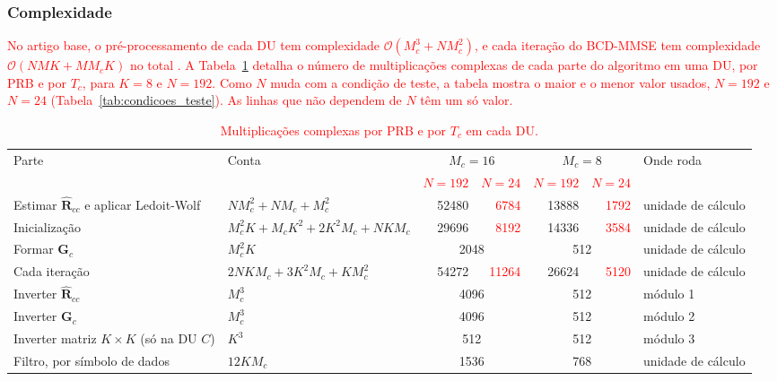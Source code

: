 \subsubsection{Complexidade}\label{subsubsec:bcd-complexidade}
\textcolor{red}{No artigo base, o pré-processamento de cada DU tem complexidade $\mathcal{O}(M_c^3 + N M_c^2)$, e cada iteração do BCD-MMSE tem complexidade $\mathcal{O}(NMK + M M_c K)$ no total \cite{zhao2025jsac}. A Tabela~\ref{tab:bcd-complexidade} detalha o número de multiplicações complexas de cada parte do algoritmo em uma DU, por PRB e por $T_c$, para $K = 8$ e \sout{$N = 192$}.} \textcolor{red}{Como $N$ muda com a condição de teste, a tabela mostra o maior e o menor valor usados, $N = 192$ e $N = 24$ (Tabela~\ref{tab:condicoes_teste}). As linhas que não dependem de $N$ têm um só valor.}

\begin{table}[htbp]
\caption{\textcolor{red}{Multiplicações complexas por PRB e por $T_c$ em cada DU.}}
\label{tab:bcd-complexidade}
\centering
\footnotesize
\renewcommand{\arraystretch}{1.2}
\begin{tabular}{|p{3.6cm}|l|r|r|r|r|l|}
\hline
\raggedright Parte & Conta & \multicolumn{2}{c|}{$M_c = 16$} & \multicolumn{2}{c|}{$M_c = 8$} & Onde roda \tabularnewline
\cline{3-6}
 & & \textcolor{red}{$N = 192$} & \textcolor{red}{$N = 24$} & \textcolor{red}{$N = 192$} & \textcolor{red}{$N = 24$} & \tabularnewline
\hline
\raggedright Estimar $\hat{\mathbf R}_{cc}$ e aplicar Ledoit-Wolf & $N M_c^2 + N M_c + M_c^2$ & 52480 & \textcolor{red}{6784} & 13888 & \textcolor{red}{1792} & unidade de cálculo \tabularnewline
\raggedright Inicialização & $M_c^2 K + M_c K^2 + 2K^2 M_c + N K M_c$ & 29696 & \textcolor{red}{8192} & 14336 & \textcolor{red}{3584} & unidade de cálculo \tabularnewline
\raggedright Formar $\mathbf G_c$ & $M_c^2 K$ & \multicolumn{2}{c|}{2048} & \multicolumn{2}{c|}{512} & unidade de cálculo \tabularnewline
\raggedright Cada iteração & $2NKM_c + 3K^2 M_c + K M_c^2$ & 54272 & \textcolor{red}{11264} & 26624 & \textcolor{red}{5120} & unidade de cálculo \tabularnewline
\raggedright Inverter $\hat{\mathbf R}_{cc}$ & $M_c^3$ & \multicolumn{2}{c|}{4096} & \multicolumn{2}{c|}{512} & módulo 1 \tabularnewline
\raggedright Inverter $\mathbf G_c$ & $M_c^3$ & \multicolumn{2}{c|}{4096} & \multicolumn{2}{c|}{512} & módulo 2 \tabularnewline
\raggedright Inverter matriz $K \times K$ (só na DU $C$) & $K^3$ & \multicolumn{2}{c|}{512} & \multicolumn{2}{c|}{512} & módulo 3 \tabularnewline
\raggedright Filtro, por símbolo de dados & $12 K M_c$ & \multicolumn{2}{c|}{1536} & \multicolumn{2}{c|}{768} & unidade de cálculo \tabularnewline
\hline
\end{tabular}
\end{table}

